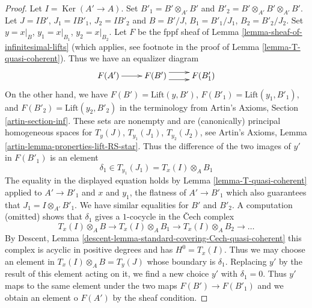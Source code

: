 \documentclass[10pt,a4paper]{amsart}
\theoremstyle{plain}
\theoremstyle{definition}
\theoremstyle{remark}
\numberwithin{equation}{subsection}
\def\Ker{\mathop{\mathrm{Ker}}}
\begin{document}
\begin{proof}
Let $I = \Ker(A' \to A)$. Set $B'_1 = B' \otimes_{A'} B'$ and
$B'_2 = B' \otimes_{A'} B' \otimes_{A'} B'$. Let
$J = IB'$, $J_1 = IB'_1$, $J_2 = IB'_2$ and
$B = B'/J$, $B_1 = B'_1/J_1$, $B_2 = B'_2/J_2$.
Set $y = x|_B$, $y_1 = x|_{B_1}$, $y_2 = x|_{B_2}$.
Let $F$ be the fppf sheaf of
Lemma \ref{lemma-sheaf-of-infinitesimal-lifts}
(which applies, see footnote in the proof of
Lemma \ref{lemma-T-quasi-coherent}).
Thus we have an equalizer diagram
$$
\xymatrix{
F(A') \ar[r] &
F(B') \ar@<1ex>[r] \ar@<-1ex>[r] &
F(B'_1)
}
$$
On the other hand, we have $F(B') = \text{Lift}(y, B')$,
$F(B'_1) = \text{Lift}(y_1, B'_1)$, and $F(B'_2) = \text{Lift}(y_2, B'_2)$
in the terminology from Artin's Axioms, Section \ref{artin-section-inf}.
These sets are nonempty and are (canonically) principal homogeneous spaces for
$T_y(J)$, $T_{y_1}(J_1)$, $T_{y_2}(J_2)$, see
Artin's Axioms, Lemma \ref{artin-lemma-properties-lift-RS-star}.
Thus the difference of the two images of $y'$ in
$F(B'_1)$ is an element
$$
\delta_1 \in T_{y_1}(J_1) = T_x(I) \otimes_A B_1
$$
The equality in the displayed equation holds by
Lemma \ref{lemma-T-quasi-coherent} applied to
$A' \to B'_1$ and $x$ and $y_1$, the flatness of $A' \to B'_1$
which also guarantees that $J_1 = I \otimes_{A'} B'_1$. We have
similar equalities for $B'$ and $B'_2$.
A computation (omitted) shows that $\delta_1$ gives
a $1$-cocycle in the {\v C}ech complex
$$
T_x(I) \otimes_A B \to
T_x(I) \otimes_A B_1 \to
T_x(I) \otimes_A B_2 \to \ldots
$$
By Descent, Lemma \ref{descent-lemma-standard-covering-Cech-quasi-coherent}
this complex is acyclic in positive degrees and has $H^0 = T_x(I)$.
Thus we may choose an element in $T_x(I) \otimes_A B = T_y(J)$
whose boundary is $\delta_1$. Replacing $y'$ by the result
of this element acting on it, we find a new choice $y'$ with $\delta_1 = 0$.
Thus $y'$ maps to the same element under the two maps
$F(B') \to F(B'_1)$ and we obtain an element o $F(A')$ by
the sheaf condition.
\end{proof}
\end{document}
